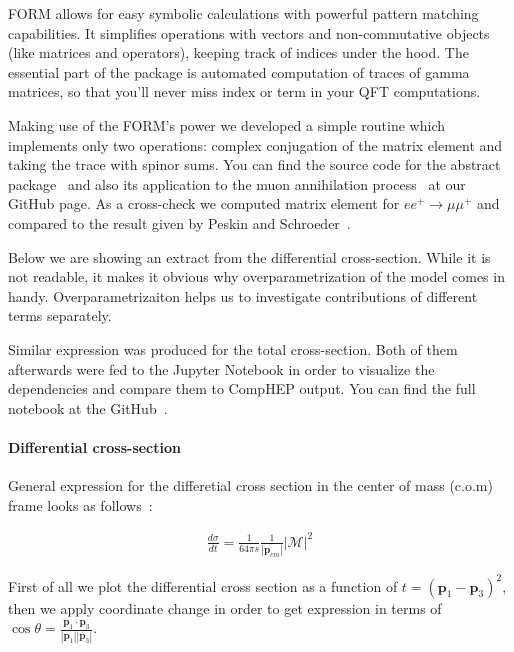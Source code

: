 \documentclass{article}
\newcommand{\Mel}{\mathcal{M}}
\newcommand{\abs}[1]{\left|#1\right|}
\renewcommand{\vec}[1]{\mathbf{#1}}
\begin{document}
FORM allows for easy symbolic calculations with powerful pattern matching capabilities. It simplifies operations with vectors and non-commutative objects (like matrices and operators), keeping track of indices under the hood. The essential part of the package is automated computation of traces of gamma matrices, so that you'll never miss index or term in your QFT computations.

Making use of the FORM's power we developed a simple routine which implements only two operations: complex conjugation of the matrix element and taking the trace with spinor sums. You can find the source code for the abstract package~\cite{url:form-square} and also its application to the muon annihilation process~\cite{url:rbpp-symbolic} at our GitHub page. As a cross-check we computed matrix element for $e e^{+} \rightarrow \mu \mu^{+}$ and compared to the result given by Peskin and Schroeder~\cite{book:peskin}.

Below we are showing an extract from the differential cross-section. While it is not readable, it makes it obvious why overparametrization of the model comes in handy. Overparametrizaiton helps us to investigate contributions of different terms separately.



Similar expression was produced for the total cross-section. Both of them afterwards were fed to the Jupyter Notebook in order to visualize the dependencies and compare them to CompHEP output. You can find the full notebook at the GitHub~\cite{url:rbpp-visualize}.

\paragraph{Differential cross-section} General expression for the differetial cross section in the center of mass (c.o.m) frame looks as follows~\cite{book:pdg}:

\begin{align}
    \frac{d \sigma}{d t} = \frac{1}{64 \pi s} \frac{1}{\abs{\vec{p}_{cm}}} \abs{\Mel}^2
\end{align}

First of all we plot the differential cross section as a function of $t = {(\vec{p}_1 - \vec{p}_3)}^2$, then we apply coordinate change in order to get expression in terms of $\cos{\theta} = \frac{\vec{p}_1 \cdot \vec{p}_3}{\abs{\vec{p}_1} \abs{\vec{p}_3}}$.
\end{document}
